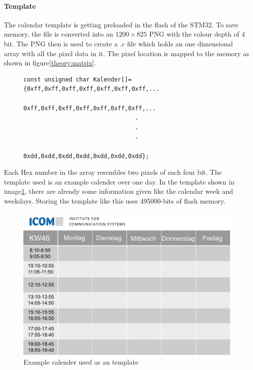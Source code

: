 \paragraph{Template}
The calendar template is getting preloaded in the flash of the STM32. To save memory, the file is converted into an $1200 \times 825$ PNG with the colour depth of 4 bit. The PNG then is used to create a .c file which holds an one dimensional array with all the pixel data in it. The pixel location is mapped to the memory as shown in figure\ref{theory:matrix}. 

\begin{figure}[H]
	\begin{lstlisting}
const unsigned char Kalender[]={0xff,0xff,0xff,0xff,0xff,0xff,0xff,...
								0xff,0xff,0xff,0xff,0xff,0xff,0xff,...
								.
								.
								.
								0xdd,0xdd,0xdd,0xdd,0xdd,0xdd,0xdd};
	\end{lstlisting}
\end{figure}
Each Hex number in the array resembles two pixels of each four bit. The template used is an example calender over one day. In the template shown in image\ref{software:kalender}, there are already some information given like the calendar week and weekdays. Storing the template like this uses 495000-bits of flash memory. 
\begin{figure}[H]
	\centering
	\includegraphics[height=0.6\textwidth]{4-development/software/graphics/Kalender.png}
	\caption{Example calender used as an template\label{software:kalender}}
\end{figure}


